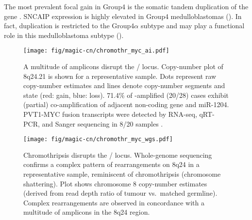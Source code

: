 The most prevalent focal gain in Group4 is the somatic tandem duplication of the  gene . SNCAIP expression is highly elevated in Group4 medulloblastomas (). In fact,  duplication is restricted to the Group4$\alpha$ subtype and may play a functional role in this medulloblastoma subtype ().

\begin{figure}[t]
	\begin{center}
		\texttt{[image: fig/magic-cn/chromothr\_myc\_ai.pdf]}
	\end{center}
	\caption[A multitude of amplicons disrupt the / locus]
	{
	A multitude of amplicons disrupt the / locus.
	Copy-number plot of 8q24.21 is shown for a representative sample. Dots represent raw copy-number estimates and lines denote copy-number segments and state (red: gain, blue: loss). 71.4\% of -amplified (20/28) cases exhibit (partial) co-amplification of adjacent non-coding  gene and miR-1204. PVT1-MYC fusion transcripts were detected by RNA-seq, qRT-PCR, and Sanger sequencing in 8/20 samples .
	}
	\label{fig:chromothr_myc}
\end{figure}


\begin{figure}[b]
	\begin{center}
		\texttt{[image: fig/magic-cn/chromothr\_myc\_wgs.pdf]}
	\end{center}
	\caption[Chromothripsis disrupts the / locus.]
	{
		Chromothripsis disrupts the / locus.
		Whole-genome sequencing confirms a complex pattern of rearrangements on 8q24 in a representative sample, reminiscent of chromothripsis (chromosome shattering).
		Plot shows chromosome 8 copy-number estimates (derived from read depth ratio of tumour vs.\ matched germline).
		Complex rearrangements are observed in concordance with a multitude of amplicons in the 8q24 region.
	}
	\label{fig:chromothr_myc_wgs}
\end{figure}

